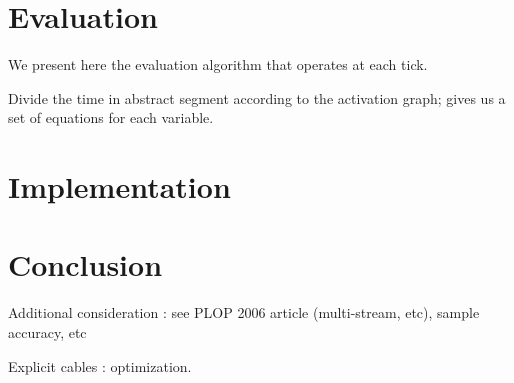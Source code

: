\documentclass{article}
\begin{document}
	\section{Evaluation}
    We present here the evaluation algorithm that operates at each tick.
    
    
	Divide the time in abstract segment according to the activation graph; gives us a set of equations for each variable.
	\section{Implementation}
    \section{Conclusion}
    Additional consideration : see PLOP 2006 article (multi-stream, etc), sample accuracy, etc
    
    Explicit cables : optimization.
\end{document}

